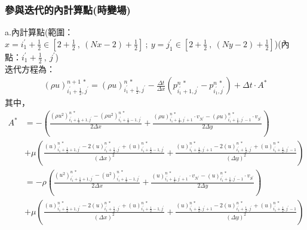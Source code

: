 \documentclass[12pt]{article}
\begin{document}
\subsubsection{參與迭代的內計算點(時變場)}
\noindent a.內計算點(範圍：$x = i_{1}^{\prime} + \frac{1}{2} \in [2+\frac{1}{2}\ ,\ (Nx-2)+\frac{1}{2}] \ ;\ y = j_{1}^{\prime} \in [2+\frac{1}{2}\ ,\ (Ny-2)+\frac{1}{2}]$)(內點：$i_{1}^{\prime}+\frac{1}{2}\ ,\ j^{\prime}$)\\[1.5ex]
\noindent 迭代方程為：
\begin{equation}\begin{split}
    (\rho u)_{i_{1}^{\prime}+\frac{1}{2},j^{\prime}}^{n+1\ *} = (\rho u)_{i_{1}^{\prime}+\frac{1}{2},j^{\prime}}^{n\ *} - \frac{\Delta t}{\Delta x}(p_{i_{1}^{\prime}+1,j^{\prime}}^{n\ *} - p_{i_{1}^{\prime},j^{\prime}}^{n\ *}) + \Delta t\cdot A^{*}
\end{split}\end{equation}
\noindent 其中，
\begin{equation*}\begin{split}
    A^{*} 
    &= -\left(\frac{(\rho u^{2} )_{i_{1}^{\prime}+\frac{1}{2}+1,j^{\prime}}^{n\ *} - (\rho u^{2})_{i_{1}^{\prime}+\frac{1}{2} - 1,j^{\prime}}^{n\ *}}{2\Delta x} + \frac{(\rho u)_{i_{1}^{\prime}+\frac{1}{2},j^{\prime}+1}^{n\ *}\cdot v_{N^{\prime}}- (\rho u)_{i_{1}^{\prime}+\frac{1}{2},j^{\prime}-1}^{n\ *}\cdot v_{S^{\prime}}}{2\Delta y}\right)\\[1.5ex]
    &+\mu\left(\frac{(u)_{i_{1}^{\prime}+\frac{1}{2}+1,j^{\prime}}^{n\ *}-2(u)_{i_{1}^{\prime}+\frac{1}{2},j^{\prime}}^{n\ *}+(u)_{i_{1}^{\prime}+\frac{1}{2}-1,j^{\prime}}^{n\ *}}{(\Delta x)^{2}}+\frac{(u)_{i_{1}^{\prime}+\frac{1}{2},j^{\prime}+1}^{n\ *}-2(u)_{i_{1}^{\prime}+\frac{1}{2},j^{\prime}}^{n\ *}+(u)_{i_{1}^{\prime}+\frac{1}{2},j^{\prime}-1}^{n\ *}}{(\Delta y)^{2}}\right)\\[1.5ex]
    &= -\rho \left(\frac{(u^{2})_{i_{1}^{\prime}+\frac{1}{2}+1,j^{\prime}}^{n\ *} - (u^{2})_{i_{1}^{\prime}+\frac{1}{2} - 1,j^{\prime}}^{n\ *}}{2\Delta x} + \frac{(u)_{i_{1}^{\prime}+\frac{1}{2},j^{\prime}+1}^{n\ *}\cdot v_{N^{\prime}}- (u)_{i_{1}^{\prime}+\frac{1}{2},j^{\prime}-1}^{n\ *}\cdot v_{S^{\prime}}}{2\Delta y}\right)\\[1.5ex]
    &+\mu\left(\frac{(u)_{i_{1}^{\prime}+\frac{1}{2}+1,j^{\prime}}^{n\ *}-2(u)_{i_{1}^{\prime}+\frac{1}{2},j^{\prime}}^{n\ *}+(u)_{i_{1}^{\prime}+\frac{1}{2}-1,j^{\prime}}^{n\ *}}{(\Delta x)^{2}}+\frac{(u)_{i_{1}^{\prime}+\frac{1}{2},j^{\prime}+1}^{n\ *}-2(u)_{i_{1}^{\prime}+\frac{1}{2},j^{\prime}}^{n\ *}+(u)_{i_{1}^{\prime}+\frac{1}{2},j^{\prime}-1}^{n\ *}}{(\Delta y)^{2}}\right)\\[1.5ex]
\end{split}\end{equation*}
\end{document}
